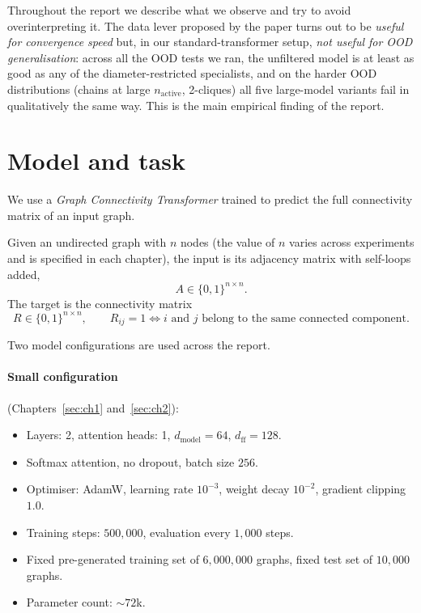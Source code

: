 \documentclass[11pt,a4paper]{article}
\begin{document}
Throughout the report we describe what we observe and try to avoid
overinterpreting it. The data lever proposed by the paper turns out to be
\emph{useful for convergence speed} but, in our standard-transformer setup,
\emph{not useful for OOD generalisation}: across all the OOD tests we ran,
the unfiltered model is at least as good as any of the diameter-restricted
specialists, and on the harder OOD distributions (chains at large
$n_{\text{active}}$, 2-cliques) all five large-model variants fail in
qualitatively the same way. This is the main empirical finding of the
report.

\section{Model and task}
\label{sec:model}

We use a \emph{Graph Connectivity Transformer} trained to predict the full
connectivity matrix of an input graph.

Given an undirected graph with $n$ nodes (the value of $n$ varies across
experiments and is specified in each chapter), the input is its adjacency
matrix with self-loops added,
\[
A \in \{0,1\}^{n \times n}.
\]
The target is the connectivity matrix
\[
R \in \{0,1\}^{n \times n}, \qquad
R_{ij} = 1 \iff i \text{ and } j \text{ belong to the same connected component.}
\]

Two model configurations are used across the report.

\paragraph{Small configuration} (Chapters~\ref{sec:ch1} and~\ref{sec:ch2}):
\begin{itemize}
    \item Layers: 2, attention heads: 1, $d_{\mathrm{model}} = 64$,
          $d_{\mathrm{ff}} = 128$.
    \item Softmax attention, no dropout, batch size $256$.
    \item Optimiser: AdamW, learning rate $10^{-3}$, weight decay $10^{-2}$,
          gradient clipping $1.0$.
    \item Training steps: $500{,}000$, evaluation every $1{,}000$ steps.
    \item Fixed pre-generated training set of $6{,}000{,}000$ graphs, fixed
          test set of $10{,}000$ graphs.
    \item Parameter count: $\sim 72$k.
\end{itemize}
\end{document}

